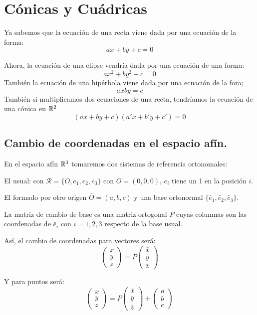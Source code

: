 \newpage

\section{Cónicas y Cuádricas}
Ya sabemos que la ecuación de una recta viene dada por una ecuación de la forma:
\[
ax + by +c = 0
\]

Ahora, la ecuación de una elipse vendría dada por una ecuación de una forma:
\[
ax^2 + by^2 + c = 0
\]
También la ecuación de una hipérbola viene dada por una ecuación de la fora;
\[
axby = c
\]
También si multiplicamos dos ecuaciones de una recta, tendríamos la ecuación de una cónica en $\mathbb{R}^2$
\[
(ax + by +c)(a'x+b'y+c') = 0
\]

\subsection{Cambio de coordenadas en el espacio afín.}

En el espacio afín $\mathbb{R}^3$ tomaremos dos sistemas de referencia ortonomales:
\begin{nlist}
	\item El usual: con $\mathcal R = \{O, e_1, e_2, e_3\}$ con $O=(0,0,0)$, $e_i$ tiene un 1 en la posición $i$.
	\item El formado por otro origen $\bar O = (a,b,c)$ y una base ortonormal $\{\bar e_1, \bar e_2, \bar e_3\}$.
\end{nlist}

La matriz de cambio de base es una matriz ortogonal $P$ cuyas columnas son las coordenadas de $\bar e_i$ con $i=1,2,3$ respecto de la base usual.

Así, el cambio de coordenadas para vectores será:
\[
\begin{pmatrix}
x\\
y\\
z
\end{pmatrix}  = P \begin{pmatrix}
\bar x\\
\bar y\\
\bar z
\end{pmatrix}
\]

Y para puntos será:
\[
\begin{pmatrix}
x\\
y\\
z
\end{pmatrix} = P \begin{pmatrix}
\bar x\\
\bar y\\
\bar z
\end{pmatrix}  + \begin{pmatrix}
 a\\
 b\\
 c
\end{pmatrix}
\]





